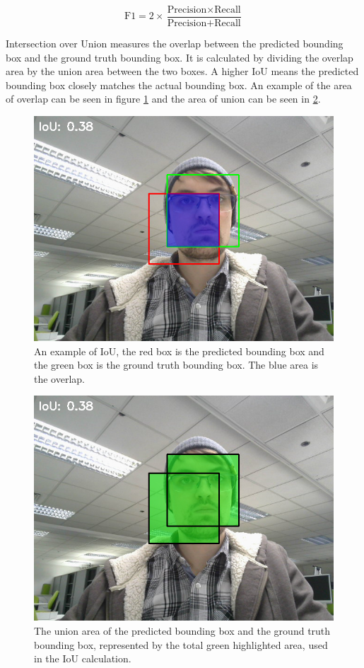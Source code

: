 \[
\text{F1} = 2 \times \frac{\text{Precision} \times \text{Recall}}{\text{Precision} + \text{Recall}}
\]

Intersection over Union measures the overlap between the predicted bounding box and the ground truth bounding box. It is calculated by dividing the overlap area by the union area between the two boxes. A higher IoU means the predicted bounding box closely matches the actual bounding box. An example of the area of overlap can be seen in figure \ref{figure:iou} and the area of union can be seen in \ref{figure:union}.

\begin{figure}[!htb]
    \centering{}
    \includegraphics[scale=0.35]{fed_images/iou_overlap.png}
    \caption{An example of IoU, the red box is the predicted bounding box and the green box is the ground truth bounding box. The blue area is the overlap.}
    \label{figure:iou}
\end{figure}

\begin{figure}[!htb]
    \centering{}
    \includegraphics[scale=0.35]{fed_images/iou_individual_boxes.png}
    \caption{The union area of the predicted bounding box and the ground truth bounding box, represented by the total green highlighted area, used in the IoU calculation.}
    \label{figure:union}
\end{figure}


